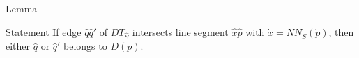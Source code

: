 \documentclass{beamer}
\begin{document}
\begin{frame}{Lemma}
\begin{block}{Statement}
If edge $\hat{q}{\hat{q}\prime}$ of $DT_{\hat{S}}$ intersects line segment $\hat{x}\hat{p}$ with $\dot{x} = NN_{\dot{S}}(\dot{p})$, then either $\hat{q}$ or ${\hat{q}\prime}$ belongs to $D(p)$.

\end{block}

\end{frame}


%
%
%
%



%
%	


%
%
%
%
\end{document}
